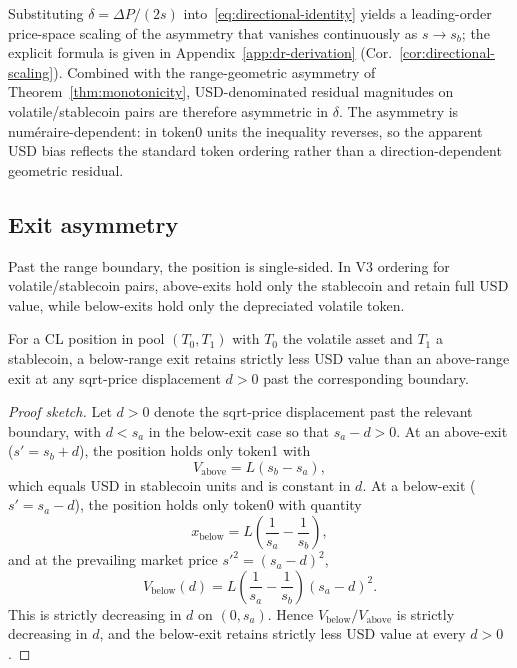 \documentclass{manuscript}
\begin{document}
Substituting $\delta = \Delta P/(2s)$ into~\eqref{eq:directional-identity} yields a leading-order price-space scaling of the asymmetry that vanishes continuously as $s \to s_b$; the explicit formula is given in Appendix~\ref{app:dr-derivation} (Cor.~\ref{cor:directional-scaling}). Combined with the range-geometric asymmetry of Theorem~\ref{thm:monotonicity}, USD-denominated residual magnitudes on volatile/stablecoin pairs are therefore asymmetric in $\delta$. The asymmetry is num\'eraire-dependent: in token0 units the inequality reverses, so the apparent USD bias reflects the standard token ordering rather than a direction-dependent geometric residual.

\subsection{Exit asymmetry}\label{sec:exit}

Past the range boundary, the position is single-sided. In V3 ordering for volatile/stablecoin pairs, above-exits hold only the stablecoin and retain full USD value, while below-exits hold only the depreciated volatile token.

\begin{theorem}\label{thm:exit}
For a CL position in pool $(T_0, T_1)$ with $T_0$ the volatile asset and $T_1$ a stablecoin, a below-range exit retains strictly less USD value than an above-range exit at any sqrt-price displacement $d > 0$ past the corresponding boundary.
\end{theorem}

\begin{proof}[Proof sketch]
Let $d > 0$ denote the sqrt-price displacement past the relevant boundary, with $d < s_a$ in the below-exit case so that $s_a - d > 0$. At an above-exit ($s' = s_b + d$), the position holds only token1 with
\[
V_{\text{above}} = L(s_b - s_a),
\]
which equals USD in stablecoin units and is constant in $d$. At a below-exit ($s' = s_a - d$), the position holds only token0 with quantity
\[
x_{\text{below}} = L\left(\frac{1}{s_a} - \frac{1}{s_b}\right),
\]
and at the prevailing market price $s'^2 = (s_a - d)^2$,
\begin{equation}\label{eq:vbelow}
V_{\text{below}}(d) = L\left(\frac{1}{s_a} - \frac{1}{s_b}\right)(s_a - d)^2.
\end{equation}
This is strictly decreasing in $d$ on $(0, s_a)$. Hence $V_{\text{below}}/V_{\text{above}}$ is strictly decreasing in $d$, and the below-exit retains strictly less USD value at every $d > 0$.
\end{proof}
\end{document}

